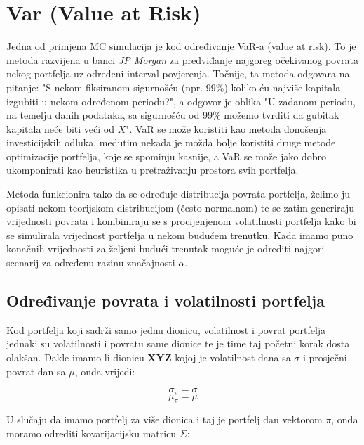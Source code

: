 \documentclass[times, utf8, seminar]{fer}
\begin{document}
\section{Var (Value at Risk)}
Jedna od primjena MC simulacija je kod određivanje VaR-a (value at risk). To je metoda razvijena u banci \emph{JP Morgan} za predviđanje najgoreg očekivanog povrata nekog portfelja uz određeni interval povjerenja. Točnije, ta metoda odgovara na pitanje: "S nekom fiksiranom sigurnošću (npr. 99\%) koliko ću najviše kapitala izgubiti u nekom određenom periodu?", a odgovor je oblika "U zadanom periodu, na temelju danih podataka, sa sigurnošću od 99\% možemo tvrditi da gubitak kapitala neće biti veći od $X$". VaR se može koristiti kao metoda donošenja investicijskih odluka, međutim nekada je možda bolje koristiti druge metode optimizacije portfelja, koje se spominju kasnije, a VaR se može jako dobro ukomponirati kao heuristika u pretraživanju prostora svih portfelja.



Metoda funkcionira tako da se određuje distribucija povrata portfelja, želimo ju opisati nekom teorijskom distribucijom (često normalnom) te se zatim generiraju vrijednosti povrata i kombiniraju se s procijenjenom volatilnosti portfelja kako bi se simulirala vrijednost portfelja u nekom budućem trenutku. Kada imamo puno konačnih vrijednosti za željeni budući trenutak moguće je odrediti najgori scenarij za određenu razinu značajnosti $\alpha$.

\subsection{Određivanje povrata i volatilnosti portfelja}

Kod portfelja koji sadrži samo jednu dionicu, volatilnost i povrat portfelja jednaki su volatilnosti i povratu same dionice te je time taj početni korak dosta olakšan. Dakle imamo li dionicu \textbf{XYZ} kojoj je volatilnost dana sa $\sigma$ i prosječni povrat dan sa $\mu$, onda vrijedi:

\[ \sigma_{\pi} = \sigma \]
\[ \mu_{\pi} = \mu \]

U slučaju da imamo portfelj za više dionica i taj je portfelj dan vektorom \( \pi \), onda moramo odrediti kovarijacijsku matricu \( \Sigma \):
\end{document}
